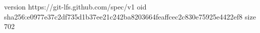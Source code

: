 version https://git-lfs.github.com/spec/v1
oid sha256:e0977e37c2df735d1b37ee21c242ba8203664feaffcec2c830e75925e4422ef8
size 702
